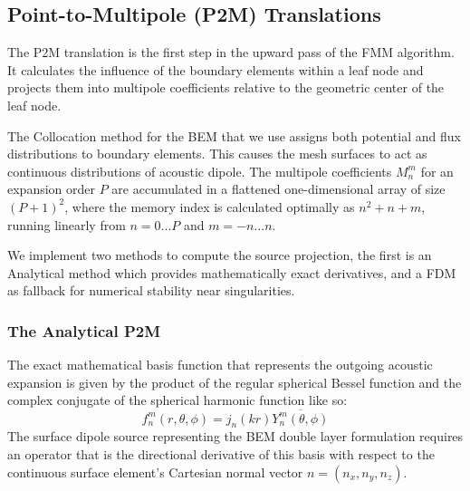 \subsection{Point-to-Multipole (P2M) Translations}
The \ac{P2M} translation is the first step in the upward pass of the \ac{FMM} algorithm. It calculates the influence of the boundary elements within a leaf node and projects them into multipole coefficients relative to the geometric center of the leaf node. 

The Collocation method for the \ac{BEM} that we use assigns both potential and flux distributions to boundary elements. This causes the mesh surfaces to act as continuous distributions of acoustic dipole. The multipole coefficients $M_{n}^m$  for an expansion order $P$ are accumulated in a flattened one-dimensional array of size $(P+1)^2$, where the memory index is calculated optimally as $n^2 + n + m$, running linearly from $n=0...P$ and $m=-n...n$.

We implement two methods to compute the source projection, the first is an Analytical method which provides mathematically exact derivatives, and a \ac{FDM} as fallback for numerical stability near singularities.

\subsubsection{The Analytical \ac{P2M}} \label{analytical-p2m}

The exact mathematical basis function that represents the outgoing acoustic expansion is given by the product of the regular spherical Bessel function and the complex conjugate of the spherical harmonic function like so:
\begin{equation}
    f_n^m(r, \theta, \phi) = j_n(kr) \overline{Y_n^m(\theta, \phi)}
\end{equation}
The surface dipole source representing the \ac{BEM} double layer formulation requires an operator that is the directional derivative of this basis with respect to the continuous surface element's Cartesian normal vector $n = (n_x, n_y, n_z)$.

